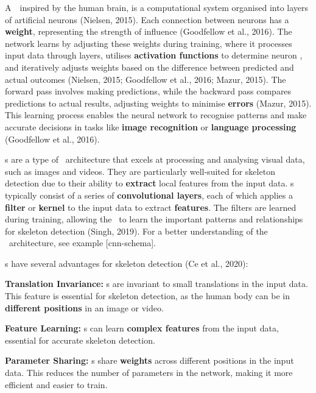 
A~\NN\, inspired by the human brain, is a computational system organised into layers of artificial neurons (\scc Nielsen, 2015). Each connection between neurons has a {\bf weight}, representing the strength of influence (\scc Goodfellow et al., 2016). The network learns by adjusting these weights during training, where it processes input data through layers, utilises {\bf activation functions} to determine neuron , and iteratively adjusts weights based on the difference between predicted and actual outcomes (\scc Nielsen, 2015; \scc Goodfellow et al., 2016; \scc Mazur, 2015). The forward pass involves making predictions, while the backward pass compares predictions to actual results, adjusting weights to minimise {\bf errors} (\scc Mazur, 2015). This learning process enables the neural network to recognise patterns and make accurate decisions in tasks like {\bf image recognition} or {\bf language processing} (\scc Goodfellow et al., 2016).

\CNN\-s are a type of \NN\ architecture that excels at processing and analysing visual data, such as images and videos. They are particularly well-suited for skeleton detection due to their ability to {\bf extract} local features from the input data. \CNN\-s typically consist of a series of {\bf convolutional layers}, each of which applies a {\bf filter} or {\bf kernel} to the input data to extract {\bf features}. The filters are learned during training, allowing the \CNN\ to learn the important patterns and relationships for skeleton detection (\scc Singh, 2019). For a better understanding of the \CNN\ architecture, see example [cnn-schema].

\CNN\-s have several advantages for skeleton detection (\scc Ce et al., 2020):

\startitemize[1]
 \item {\bf Translation Invariance:} \CNN\-s are invariant to small translations in the input data. This feature is essential for skeleton detection, as the human body can be in {\bf different positions} in an image or video.
 \item {\bf Feature Learning:} \CNN\-s can learn {\bf complex features} from the input data, essential for accurate skeleton detection.
 \item {\bf Parameter Sharing:} \CNN\-s share {\bf weights} across different positions in the input data. This reduces the number of parameters in the network, making it more efficient and easier to train.
\stopitemize

